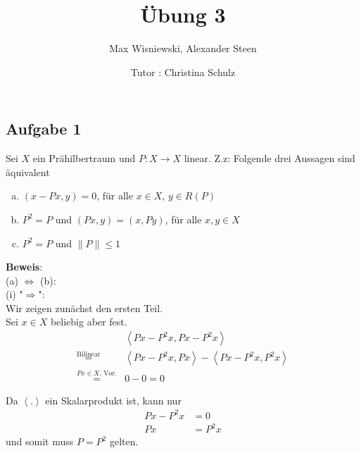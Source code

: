 \documentclass[11pt,a4paper,ngerman]{article}
\date{Tutor : Christina Schulz}
\title{Übung 3}
\author{Max Wisniewski, Alexander Steen}
\begin{document}

\renewcommand{\figurename}{Figure}

\maketitle
\thispagestyle{fancy}

\subsection*{Aufgabe 1}
Sei $X$ ein Prähilbertraum und $P: X \to X$ linear. Z.z: Folgende drei Aussagen sind äquivalent
\begin{enumerate}[(a)]
\item $(x-Px,y) = 0$, für alle $x \in X$, $y \in R(P)$ 
\item $P^2 = P$ und $(Px,y) = (x,Py)$, für alle $x,y \in X$ 
\item $P^2 = P$ und $\|P\| \leq 1$
\end{enumerate}
\textbf{Beweis}:\\
(a) $\Leftrightarrow$ (b): \\
(i) "$\Rightarrow$": \\
Wir zeigen zunächst den ersten Teil.\\
Sei $x \in X$ beliebig aber fest.
\begin{equation*}\begin{array}{rl}
& \left\langle Px - P^2 x, Px - P^2 x \right\rangle\\
\stackrel{\text{Bilinear}}{=}&
    \left\langle Px - P^2 x, Px \right\rangle - \left\langle Px - P^2 x, P^2 x\right\rangle\\
\stackrel{Px \in X\text{, Vor.}}{=}&
    0 - 0 = 0
\end{array}\end{equation*}

Da $\left\langle . \right\rangle$ ein Skalarprodukt ist, kann nur
\begin{equation*}\begin{split}
    Px - P^2 x &= 0\\
    Px      &= P^2 x
\end{split}\end{equation*}
und somit muss $P = P^2$ gelten.\\
\end{document}
